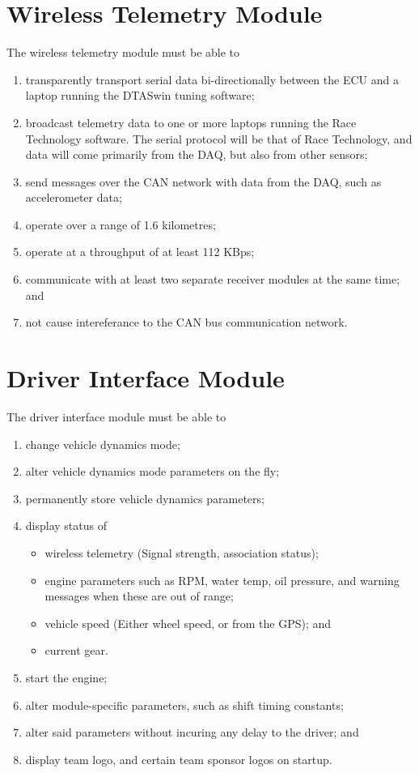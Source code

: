 \section{Wireless Telemetry Module}
The wireless telemetry module must be able to
\begin{enumerate}
 \item transparently transport serial data bi-directionally between the ECU and a laptop running the DTASwin tuning software;
 \item broadcast telemetry data to one or more laptops running the Race Technology
software. The serial protocol will be that of Race Technology, and data will
come primarily from the DAQ, but also from other sensors; 
 \item send messages over the CAN network with data from the DAQ, such as accelerometer data;
 \item operate over a range of 1.6 kilometres;
 \item operate at a throughput of at least 112 KBps; 
 \item communicate with at least two separate receiver modules at the same time; and
 \item not cause intereferance to the CAN bus communication network.
\end{enumerate}

\section{Driver Interface Module}
The driver interface module must be able to
\begin{enumerate}
 \item change vehicle dynamics mode;
 \item alter vehicle dynamics mode parameters on the fly;
 \item permanently store vehicle dynamics parameters;
 \item display status of
  \begin{itemize}
    \item wireless telemetry (Signal strength, association status);
    \item engine parameters such as RPM, water temp, oil pressure, and warning messages when these are out of range;
    \item vehicle speed (Either wheel speed, or from the GPS); and
    \item current gear.
  \end{itemize}
 \item start the engine;
 \item alter module-specific parameters, such as shift timing constants; 
 \item alter said parameters without incuring any delay to the driver; and
 \item display team logo, and certain team sponsor logos on startup.
\end{enumerate}

